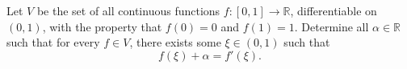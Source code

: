 Let \(V\) be the set of all continuous functions \(f\colon [0,1] \to \mathbb{R}\), differentiable on \((0,1)\), with the property that \(f(0) = 0\) and \(f(1) = 1\). Determine all \(\alpha \in \mathbb{R}\) such that for every \(f \in V\), there exists some \(\xi \in (0,1)\) such that
\[
f(\xi) + \alpha = f'(\xi).
\]
